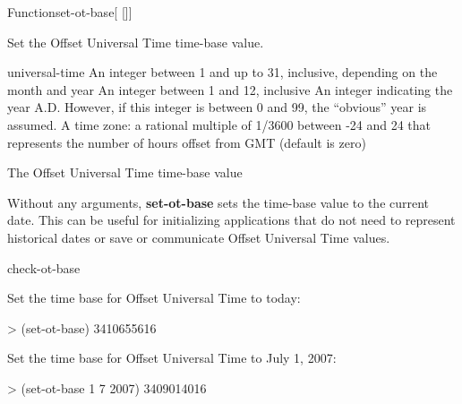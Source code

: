 \documentclass[10pt,twoside,english,pdftex]{article}
\begin{document}
\begin{functiondoc}{Function}{set-ot-base}{[
   []]
  \returns{} }
%

\fnsyntax

\fnpurpose Set the Offset Universal Time time-base value.

\fnpackage {}

\fnmodule {}

\fnargs
\begin{args}{universal-time}
  \arg[date] An integer between 1 and up to 31, inclusive, depending
  on the month and year
  \arg[month] An integer between 1 and 12, inclusive
  \arg[year] An integer indicating the year A.D. However, if this
  integer is between 0 and 99, the ``obvious'' year is assumed.
   A time zone: a rational multiple of 1/3600 between
  -24 and 24 that represents the number of hours offset from GMT 
  (default is zero)
\end{args}

\fnreturns The Offset Universal Time time-base value

\fndescription Without any arguments, \textbf{set-ot-base} sets the
time-base value to the current date.  This can be useful for
initializing applications that do not need to represent historical
dates or save or communicate Offset Universal Time values.

\begin{alsos}{check-ot-base}
\also[ot2ut]
\also[ut2ot]
\end{alsos}

\fnexamples
Set the time base for Offset Universal Time to today:
\begin{example}
> (set-ot-base)
3410655616
\end{example}
Set the time base for Offset Universal Time to July 1, 2007:
\begin{example}
> (set-ot-base 1 7 2007)
3409014016
\end{example}

\end{functiondoc}

\end{document}
